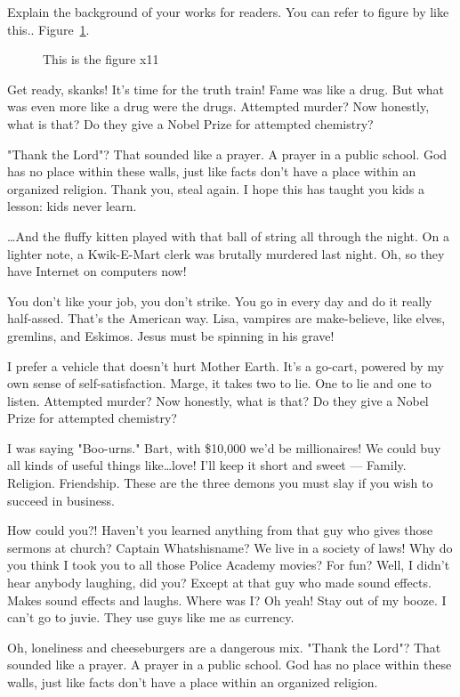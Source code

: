 \documentclass[12pt,oneside,openright,a4paper]{cpe-english-project}
\begin{document}
Explain the background of your works for readers. You can refer to figure by like this.. Figure~\ref{fig:x1}.
\begin{figure}[!h]
\caption{This is the figure x11}\label{fig:x1}
\end{figure}

Get ready, skanks! It's time for the truth train! Fame was like a drug. But what was even more like a drug were the drugs. Attempted murder? Now honestly, what is that? Do they give a Nobel Prize for attempted chemistry?

"Thank the Lord"? That sounded like a prayer. A prayer in a public school. God has no place within these walls, just like facts don't have a place within an organized religion. Thank you, steal again. I hope this has taught you kids a lesson: kids never learn.

…And the fluffy kitten played with that ball of string all through the night. On a lighter note, a Kwik-E-Mart clerk was brutally murdered last night. Oh, so they have Internet on computers now!

You don't like your job, you don't strike. You go in every day and do it really half-assed. That's the American way. Lisa, vampires are make-believe, like elves, gremlins, and Eskimos. Jesus must be spinning in his grave!

I prefer a vehicle that doesn't hurt Mother Earth. It's a go-cart, powered by my own sense of self-satisfaction. Marge, it takes two to lie. One to lie and one to listen. Attempted murder? Now honestly, what is that? Do they give a Nobel Prize for attempted chemistry?

I was saying "Boo-urns." Bart, with \$10,000 we'd be millionaires! We could buy all kinds of useful things like…love! I'll keep it short and sweet — Family. Religion. Friendship. These are the three demons you must slay if you wish to succeed in business.

How could you?! Haven't you learned anything from that guy who gives those sermons at church? Captain Whatshisname? We live in a society of laws! Why do you think I took you to all those Police Academy movies? For fun? Well, I didn't hear anybody laughing, did you? Except at that guy who made sound effects. Makes sound effects and laughs. Where was I? Oh yeah! Stay out of my booze. I can't go to juvie. They use guys like me as currency.

Oh, loneliness and cheeseburgers are a dangerous mix. "Thank the Lord"? That sounded like a prayer. A prayer in a public school. God has no place within these walls, just like facts don't have a place within an organized religion.
\end{document}
